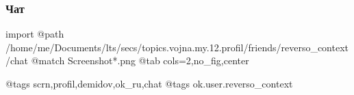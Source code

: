  
 
 
 
 

\subsubsection{Чат}

\ifcmt
  import
  @path /home/me/Documents/lts/secs/topics.vojna.my.12.profil/friends/reverso_context/chat
  @match Screenshot*.png
  @tab cols=2,no_fig,center

  @tags scrn,profil,demidov,ok_ru,chat
  @tags ok.user.reverso_context

\fi
